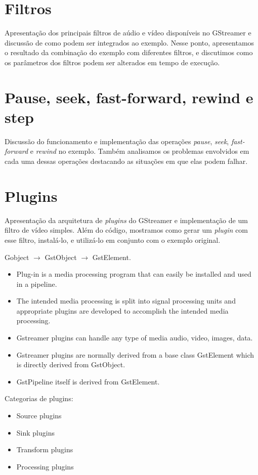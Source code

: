\documentclass{SBCbookchapter}
\begin{document}

\section{Filtros}
Apresentação dos principais filtros de aúdio e vídeo disponíveis no GStreamer e
discussão de como podem ser integrados ao exemplo.  Nesse ponto, apresentamos o
resultado da combinação do exemplo com diferentes filtros, e discutimos como os
parâmetros dos filtros podem ser alterados em tempo de execução.


\section{Pause, seek, fast-forward, rewind e step}
Discussão do funcionamento e implementação das operações \emph{pause},
\emph{seek}, \emph{fast-forward} e \emph{rewind} no exemplo.  Também analisamos
os problemas envolvidos em cada uma dessas operações destacando as situações em
que elas podem falhar.


\section{Plugins}
Apresentação da arquitetura de \emph{plugins} do GStreamer e implementação de
um filtro de vídeo simples.  Além do código, mostramos como gerar um
\emph{plugin} com esse filtro, instalá-lo, e utilizá-lo em conjunto com o
exemplo original.

Gobject $\rightarrow$ GstObject $\rightarrow$ GstElement.

\begin{itemize}
 \item Plug-in is a media processing program that can easily be installed and
       used in a pipeline.
 \item The intended media processing is split into signal processing units and
       appropriate plugins are developed to accomplish the intended media
       processing.
 \item Gstreamer plugins can handle any type of media audio, video, images,
       data.
 \item Gstreamer plugins are normally derived from a base class GstElement
       which is directly derived from GstObject.
 \item GstPipeline itself is derived from GstElement.
\end{itemize}


Categorias de plugins:

\begin{itemize}
  \item{Source plugins}
  \item{Sink plugins}
  \item{Transform plugins}
  \item{Processing plugins}
\end{itemize}
\end{document}
